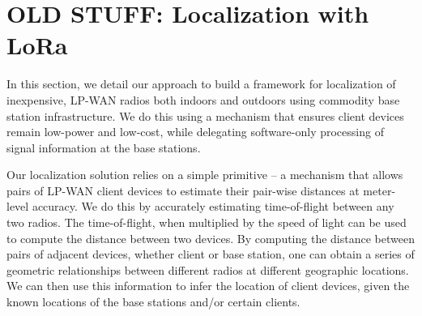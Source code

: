 \section{OLD STUFF: Localization with LoRa}
\label{sec:old-localization}




In this section, we detail our approach to build a framework for localization of inexpensive, LP-WAN radios both indoors and outdoors using commodity base station infrastructure. We do this using a mechanism that ensures client devices remain low-power and low-cost, while delegating software-only processing of signal information at the base stations. 

Our localization solution relies on a simple primitive -- a mechanism that allows pairs of LP-WAN client devices to estimate their pair-wise distances at meter-level accuracy. We do this by accurately estimating time-of-flight between any two radios. The time-of-flight, when multiplied by the speed of light can be used to compute the distance between two devices. By computing the distance between pairs of adjacent devices, whether client or base station, one can obtain a series of geometric relationships between different radios at different geographic locations. We can then use this information to infer the location of client devices, given the known locations of the base stations and/or certain clients.  

